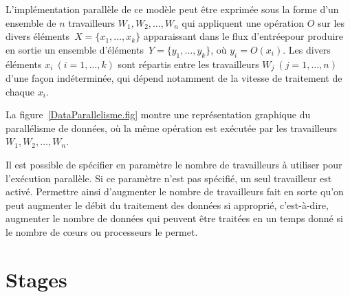 


L'impl\'ementation parall\`ele de ce mod\`ele peut \^etre
exprim\'ee sous la forme d'un ensemble de $n$ travailleurs $W_1, W_2,\ldots, W_n$ qui
appliquent une op\'eration $O$ sur les divers \'el\'ements~$X = \{x_1, \ldots, x_k\}$ apparaissant dans
le flux d'entr\'eepour produire en sortie un ensemble d'\'el\'ements~$Y = \{y_1, \ldots, y_k\}$, o\`u $y_i = O(x_i)$.
%
Les divers \'el\'ements $x_i~(i=1, \ldots, k)$ sont r\'epartis entre
les travailleurs $W_j~(j=1, \ldots, n)$ d'une fa\c{c}on
ind\'etermin\'ee, qui d\'epend notamment de la vitesse de traitement
de chaque $x_i$.
%

La figure~\ref{DataParallelisme.fig} montre une repr\'esentation graphique du parall\'elisme de donn\'ees, o\`u la m\^eme op\'eration est ex\'ecut\'ee par les travailleurs $W_1, W_2,\ldots, W_n$. 

Il est possible de sp\'ecifier en param\`etre le nombre de travailleurs \`a utiliser pour l'ex\'ecution parall\`ele. Si ce param\`etre n'est pas sp\'ecifi\'e, un seul travailleur est activ\'e. Permettre ainsi d'augmenter le nombre de travailleurs fait en sorte qu'on peut augmenter le d\'ebit du traitement des donn\'ees si appropri\'e, c'est-\`a-dire, augmenter le nombre de donn\'ees qui peuvent \^etre trait\'ees en un temps donn\'e si le nombre de c\oe{}urs ou processeurs le permet.




\section{Stages}
\label{stages.sect}


